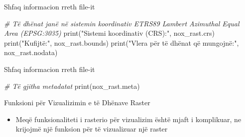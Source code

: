 \documentclass[
  ignorenonframetext,
]{beamer}
\newenvironment{Shaded}{\begin{snugshade}}{\end{snugshade}}
\newcommand{\BuiltInTok}[1]{#1}
\newcommand{\CommentTok}[1]{\textcolor[rgb]{0.56,0.35,0.01}{\textit{#1}}}
\newcommand{\NormalTok}[1]{#1}
\newcommand{\StringTok}[1]{\textcolor[rgb]{0.31,0.60,0.02}{#1}}
\providecommand{\tightlist}{%
  \setlength{\itemsep}{0pt}\setlength{\parskip}{0pt}}
\begin{document}
\begin{frame}[fragile]{Shfaq informacion rreth file-it}
\protect\hypertarget{shfaq-informacion-rreth-file-it-1}{}

\begin{Shaded}
\begin{Highlighting}[]
\CommentTok{\# Të dhënat janë në sistemin koordinativ ETRS89 Lambert Azimuthal Equal Area (EPSG:3035)}
\BuiltInTok{print}\NormalTok{(}\StringTok{"Sistemi koordinativ (CRS):"}\NormalTok{, nox\_rast.crs)}
\BuiltInTok{print}\NormalTok{(}\StringTok{"Kufijtë:"}\NormalTok{, nox\_rast.bounds)}
\BuiltInTok{print}\NormalTok{(}\StringTok{"Vlera për të dhënat që mungojnë:"}\NormalTok{, nox\_rast.nodata)}
\end{Highlighting}
\end{Shaded}
\end{frame}

\begin{frame}[fragile]{Shfaq informacion rreth file-it}
\protect\hypertarget{shfaq-informacion-rreth-file-it-2}{}

\begin{Shaded}
\begin{Highlighting}[]
\CommentTok{\# Të gjitha metadatat}
\BuiltInTok{print}\NormalTok{(nox\_rast.meta)}
\end{Highlighting}
\end{Shaded}
\end{frame}

\begin{frame}{Funksioni për Vizualizimin e të Dhënave Raster}
\protect\hypertarget{funksioni-puxebr-vizualizimin-e-tuxeb-dhuxebnave-raster}{}
\begin{itemize}
\tightlist
\item
  Meqë funksionaliteti i rasterio për vizualizim është mjaft i
  komplikuar, ne krijojmë një funksion për të vizualizuar një raster
\end{itemize}
\end{frame}
\end{document}
